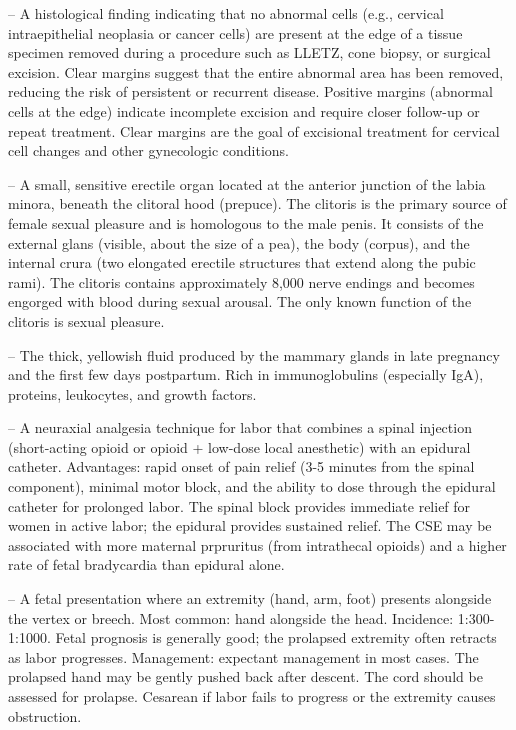 -- A histological finding indicating that no abnormal cells (e.g., cervical intraepithelial neoplasia or cancer cells) are present at the edge of a tissue specimen removed during a procedure such as LLETZ, cone biopsy, or surgical excision. Clear margins suggest that the entire abnormal area has been removed, reducing the risk of persistent or recurrent disease. Positive margins (abnormal cells at the edge) indicate incomplete excision and require closer follow-up or repeat treatment. Clear margins are the goal of excisional treatment for cervical cell changes and other gynecologic conditions.

-- A small, sensitive erectile organ located at the anterior junction of the labia minora, beneath the clitoral hood (prepuce). The clitoris is the primary source of female sexual pleasure and is homologous to the male penis. It consists of the external glans (visible, about the size of a pea), the body (corpus), and the internal crura (two elongated erectile structures that extend along the pubic rami). The clitoris contains approximately 8,000 nerve endings and becomes engorged with blood during sexual arousal. The only known function of the clitoris is sexual pleasure.

-- The thick, yellowish fluid produced by the mammary glands in late pregnancy and the first few days postpartum. Rich in immunoglobulins (especially IgA), proteins, leukocytes, and growth factors.

-- A neuraxial analgesia technique for labor that combines a spinal injection (short-acting opioid or opioid + low-dose local anesthetic) with an epidural catheter. Advantages: rapid onset of pain relief (3-5 minutes from the spinal component), minimal motor block, and the ability to dose through the epidural catheter for prolonged labor. The spinal block provides immediate relief for women in active labor; the epidural provides sustained relief. The CSE may be associated with more maternal prpruritus (from intrathecal opioids) and a higher rate of fetal bradycardia than epidural alone.

-- A fetal presentation where an extremity (hand, arm, foot) presents alongside the vertex or breech. Most common: hand alongside the head. Incidence: 1:300-1:1000. Fetal prognosis is generally good; the prolapsed extremity often retracts as labor progresses. Management: expectant management in most cases. The prolapsed hand may be gently pushed back after descent. The cord should be assessed for prolapse. Cesarean if labor fails to progress or the extremity causes obstruction.

